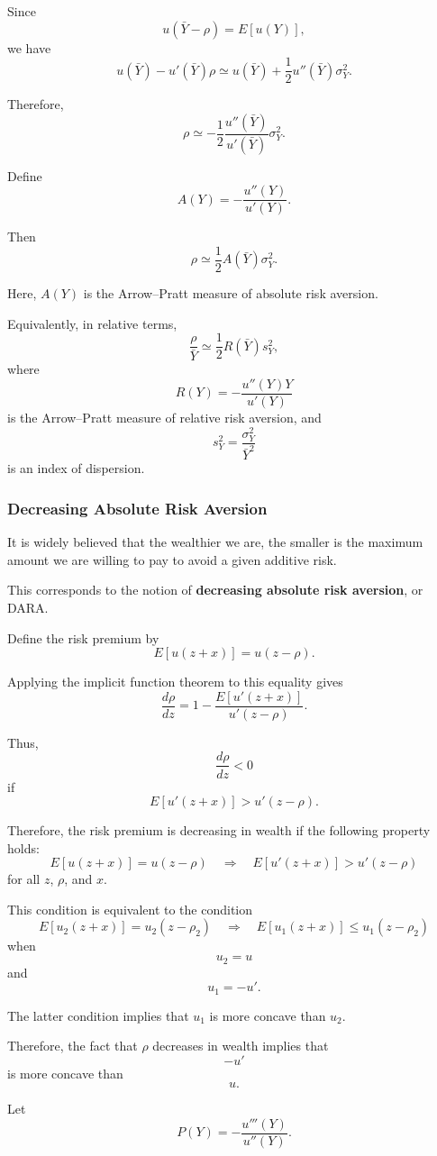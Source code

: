 Since
\[
u(\bar Y-\rho)=E[u(Y)],
\]
we have
\[
u(\bar Y)-u'(\bar Y)\rho
\simeq
u(\bar Y)
+
\frac{1}{2}u''(\bar Y)\sigma_Y^2.
\]

Therefore,
\[
\rho
\simeq
-\frac{1}{2}
\frac{u''(\bar Y)}{u'(\bar Y)}
\sigma_Y^2.
\]

Define
\[
A(Y)
=
-\frac{u''(Y)}{u'(Y)}.
\]

Then
\[
\rho
\simeq
\frac{1}{2}A(\bar Y)\sigma_Y^2.
\]

Here, \(A(Y)\) is the Arrow--Pratt measure of absolute risk aversion.

Equivalently, in relative terms,
\[
\frac{\rho}{\bar Y}
\simeq
\frac{1}{2}R(\bar Y)s_Y^2,
\]
where
\[
R(Y)
=
-\frac{u''(Y)Y}{u'(Y)}
\]
is the Arrow--Pratt measure of relative risk aversion, and
\[
s_Y^2
=
\frac{\sigma_Y^2}{\bar Y^2}
\]
is an index of dispersion.

\subsubsection{Decreasing Absolute Risk Aversion}

It is widely believed that the wealthier we are, the smaller is the maximum amount we are willing to pay to avoid a given additive risk.

This corresponds to the notion of \textbf{decreasing absolute risk aversion}, or DARA.

Define the risk premium by
\[
E[u(z+x)]
=
u(z-\rho).
\]

Applying the implicit function theorem to this equality gives
\[
\frac{d\rho}{dz}
=
1-
\frac{E[u'(z+x)]}{u'(z-\rho)}.
\]

Thus,
\[
\frac{d\rho}{dz}<0
\]
if
\[
E[u'(z+x)]>u'(z-\rho).
\]

Therefore, the risk premium is decreasing in wealth if the following property holds:
\[
E[u(z+x)]=u(z-\rho)
\quad\Longrightarrow\quad
E[u'(z+x)]>u'(z-\rho)
\]
for all \(z\), \(\rho\), and \(x\).

This condition is equivalent to the condition
\[
E[u_2(z+x)]=u_2(z-\rho_2)
\quad\Longrightarrow\quad
E[u_1(z+x)]\le u_1(z-\rho_2)
\]
when
\[
u_2=u
\]
and
\[
u_1=-u'.
\]

The latter condition implies that \(u_1\) is more concave than \(u_2\).

Therefore, the fact that \(\rho\) decreases in wealth implies that
\[
-u'
\]
is more concave than
\[
u.
\]

Let
\[
P(Y)
=
-\frac{u'''(Y)}{u''(Y)}.
\]

